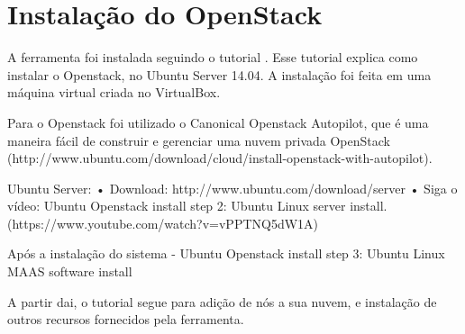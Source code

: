 \chapter[Instalação do OpenStack]{Instalação do OpenStack}\label{cap1}

A ferramenta foi instalada seguindo o tutorial \cite{ref2}. Esse tutorial explica como instalar o Openstack, no Ubuntu Server 14.04. A instalação foi feita em uma máquina virtual criada no VirtualBox.

Para o Openstack foi utilizado o Canonical Openstack Autopilot, que é uma maneira fácil de construir e gerenciar uma nuvem privada OpenStack (http://www.ubuntu.com/download/cloud/install-openstack-with-autopilot).

Ubuntu Server:
•	Download: http://www.ubuntu.com/download/server
•	Siga o vídeo: Ubuntu Openstack install step 2: Ubuntu Linux server install. (https://www.youtube.com/watch?v=vPPTNQ5dW1A)

Após a instalação do sistema - Ubuntu Openstack install step 3: Ubuntu Linux MAAS software install


A partir dai, o tutorial segue para adição de nós a sua nuvem, e instalação de outros recursos fornecidos pela ferramenta.

